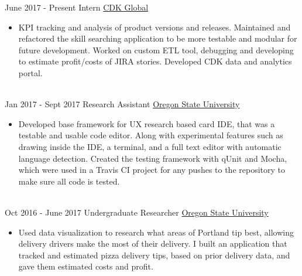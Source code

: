 \documentclass[letterpaper]{twentysecondcv} %
\begin{document}
\begin{twenty} %
\twentyitem
    	{June 2017 -}
		{Present}
        {Intern}
        {\href{https://www.cdkglobal.com/}{CDK Global}}
        {}
        {\begin{itemize}
        \item KPI tracking and analysis of product versions and releases. Maintained and refactored the skill searching application to be more testable and modular for future development. Worked on custom ETL tool, debugging and developing to estimate profit/costs of JIRA stories. Developed CDK data and analytics portal. 
        \end{itemize}}
        \\
	\twentyitem
    	{Jan 2017 -}
		{Sept 2017}
        {Research Assistant}
        {\href{http://www.oregonstate.edu}{Oregon State University}}
        {}
        {
        {\begin{itemize}
        \item Developed base framework for UX research based card IDE, that was a testable and usable code editor. Along with experimental features such as drawing inside the IDE, a terminal, and a full text editor with automatic language detection. Created the testing framework with qUnit and Mocha, which were used in a Travis CI project for any pushes to the repository to make sure all code is tested. 
    \end{itemize}}
        }
        \\
     \twentyitem
   		{Oct 2016 -}
		{June 2017}
        {Undergraduate Researcher}
        {\href{http://www.oregonstate.edu/}{Oregon State University}}
        {}
        {
        \begin{itemize}
        \item Used data visualization to research  what areas of Portland tip best, allowing delivery drivers make the most of their delivery. I built an application that tracked and estimated pizza delivery tips, based on prior delivery data, and gave them estimated costs and profit.
    \end{itemize}
    	}
        
\end{twenty}
\end{document}
